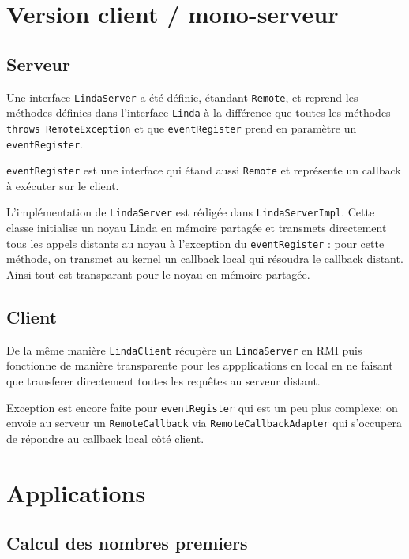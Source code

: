 \documentclass[headings=standardclasses,parskip=half]{scrartcl}
\begin{document}
\section{Version client / mono-serveur}

\subsection{Serveur}

Une interface \texttt{LindaServer} a été définie, étandant \texttt{Remote},
et reprend les méthodes définies dans l'interface \texttt{Linda} à la
différence que toutes les méthodes \texttt{throws RemoteException} et
que \texttt{eventRegister} prend en paramètre un \texttt{eventRegister}.

\texttt{eventRegister} est une interface qui étand aussi \texttt{Remote}
et représente un callback à exécuter sur le client.

L'implémentation de \texttt{LindaServer} est rédigée dans
\texttt{LindaServerImpl}. Cette classe initialise un noyau Linda en
mémoire partagée et transmets directement tous les appels distants au
noyau à l'exception du \texttt{eventRegister} : pour cette méthode,
on transmet au kernel un callback local qui résoudra le callback distant.
Ainsi tout est transparant pour le noyau en mémoire partagée.

\subsection{Client}

De la même manière \texttt{LindaClient} récupère un \texttt{LindaServer}
en RMI puis fonctionne de manière transparente pour les appplications en
local en ne faisant que transferer directement toutes les requêtes au
serveur distant.

Exception est encore faite pour \texttt{eventRegister} qui est un peu plus
complexe: on envoie au serveur un \texttt{RemoteCallback} via
\texttt{RemoteCallbackAdapter} qui s'occupera de répondre au callback
local côté client.

\section{Applications}

\subsection{Calcul des nombres premiers}
\end{document}
